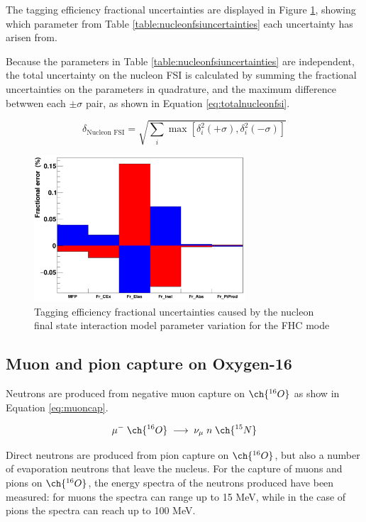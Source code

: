 The tagging efficiency fractional uncertainties are displayed in Figure \ref{fig:nucleonfsiuncertainty}, showing which parameter from Table \ref{table:nucleonfsiuncertainties} each uncertainty has arisen from.

Because the parameters in Table \ref{table:nucleonfsiuncertainties} are independent, the total uncertainty on the nucleon FSI is calculated by summing the fractional uncertainties on the parameters in quadrature, and the maximum difference betwwen each $\pm \sigma$ pair, as shown in Equation \ref{eq:totalnucleonfsi}.

\begin{equation}
    \delta_{\text{Nucleon FSI}}=\sqrt{\sum_i \max \left[\delta_i^2(+\sigma), \delta_i^2(-\sigma)\right]}
\label{eq:totalnucleonfsi}
\end{equation}

\begin{figure}[!htb]
\centering 
    \includegraphics[width=0.7\textwidth]{Figures/nucleonfsi_uncertainty.png}
\caption{Tagging efficiency fractional uncertainties caused by the nucleon final state interaction model parameter variation for the FHC mode}
\label{fig:nucleonfsiuncertainty}
\end{figure}

\subsection{Muon and pion capture on Oxygen-16}

Neutrons are produced from negative muon capture on $\ch{^{16}O}$ as show in Equation \ref{eq:muoncap}.

\begin{equation}
        \mu^{-}\;\ch{^{16}{O}}\;\longrightarrow\;\nu_{\mu}\;n\;\ch{^{15}{N}}
\label{eq:muoncap}
\end{equation}

Direct neutrons are produced from pion capture on $\ch{^{16}O}$, but also a number of evaporation neutrons that leave the nucleus. For the capture of muons and pions on $\ch{^{16}O}$, the energy spectra of the neutrons produced have been measured: for muons the spectra can range up to 15 MeV, while in the case of pions the spectra can reach up to 100 MeV.


